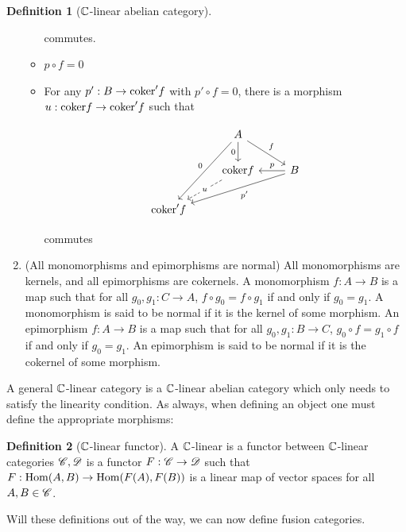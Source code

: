 \documentclass{article}
\theoremstyle{definition}
\newtheorem*{definition}{Definition}
\numberwithin{figure}{section}
\begin{document}
\begin{definition}[$\mathbb{C}$-linear abelian category]
\begin{enumerate}
\begin{itemize}
commutes.

\item $p\circ f=0$
\item For any $p':B\to \mathrm{coker}' f$ with $p'\circ f=0$, there is a morphism $u: \mathrm{coker} f\to \mathrm{coker}' f$ such that

\[\begin{tikzcd}
	& A \\
	& {\coker f} & B \\
	{\coker' f}
	\arrow["f", from=1-2, to=2-3]
	\arrow["0"', from=1-2, to=3-1]
	\arrow["{p'}", from=2-3, to=3-1]
	\arrow["0"', from=1-2, to=2-2]
	\arrow["p"', from=2-3, to=2-2]
	\arrow["u"{description}, dashed, from=2-2, to=3-1]
\end{tikzcd}\]

commutes
\end{itemize}
\item (All monomorphisms and epimorphisms are normal) All monomorphisms are kernels, and all epimorphisms are cokernels. A monomorphism $f:A\to B$ is a map such that for all $g_0,g_1: C\to A$, $f\circ g_0=f\circ g_1$ if and only if $g_0=g_1$. A monomorphism is said to be normal if it is the kernel of some morphism. An epimorphism $f:A\to B$ is a map such that for all $g_0,g_1:B\to C$, $g_0\circ f=g_1\circ f$ if and only if $g_0=g_1$. An epimorphism is said to be normal if it is the cokernel of some morphism.


\end{enumerate}
\raggedleft\qedsymbol{}
\end{definition}

A general $\mathbb{C}$-linear category is a $\mathbb{C}$-linear abelian category which only needs to satisfy the linearity condition. As always, when defining an object one must define the appropriate morphisms:

\begin{definition}[$\mathbb{C}$-linear functor] A $\mathbb{C}$-linear is a functor between $\mathbb{C}$-linear categories $\mathscr{C},\mathscr{D}$ is a functor $F:\mathscr{C}\to\mathscr{D}$ such that $F:\mathrm{Hom}(A,B)\to \mathrm{Hom}(F(A),F(B))$ is a linear map of vector spaces for all $A,B\in \mathscr{C}$.
\end{definition}

Will these definitions out of the way, we can now define fusion categories.
\end{document}
